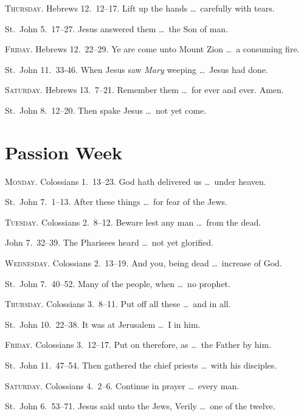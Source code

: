 {\scshape Thursday.}  Hebrews 12.~12–17.   Lift up the hands \ldots\ carefully with tears.

 St.~John 5.~17–27.   Jesus answered them \ldots\ the Son of man.

{\scshape Friday.}  Hebrews 12.~22–29.   Ye are come unto Mount Zion \ldots\ a consuming fire.

 St.~John 11.~33-46.   When Jesus saw \emph{Mary} weeping \ldots\ Jesus had done.

{\scshape Saturday.}  Hebrews 13.~7–21.   Remember them \ldots\ for ever and ever. Amen.

 St.~John 8.~12–20.   Then spake Jesus \ldots\ not yet come.
 

\section{Passion Week}

{\scshape Monday.}  Colossians 1.~13–23.   God hath delivered us \ldots\ under heaven.

 St.~John 7.~1–13.   After these things \ldots\ for fear of the Jews.

{\scshape Tuesday.}  Colossians 2.~8–12.   Beware lest any man \ldots\ from the dead.

 John 7.~32–39.   The Pharisees heard \ldots\ not yet glorified.

{\scshape Wednesday.}  Colossians 2.~13–19.   And you, being dead \ldots\ increase of God.
    
 St.~John 7.~40–52.   Many of the people, when \ldots\ no prophet.

{\scshape Thursday.}  Colossians 3.~8–11.   Put off all these \ldots\ and in all.

 St.~John 10.~22–38.   It was at Jerusalem \ldots\ I in him.

{\scshape Friday.}  Colossians 3.~12–17.   Put on therefore, as \ldots\ the Father by him.

 St.~John 11.~47–54.   Then gathered the chief priests \ldots\ with his disciples.

{\scshape Saturday.}  Colossians 4.~2–6.   Continue in prayer \ldots\ every man.

 St.~John 6.~53–71.   Jesus said unto the Jews, Verily \ldots\ one of the twelve.

